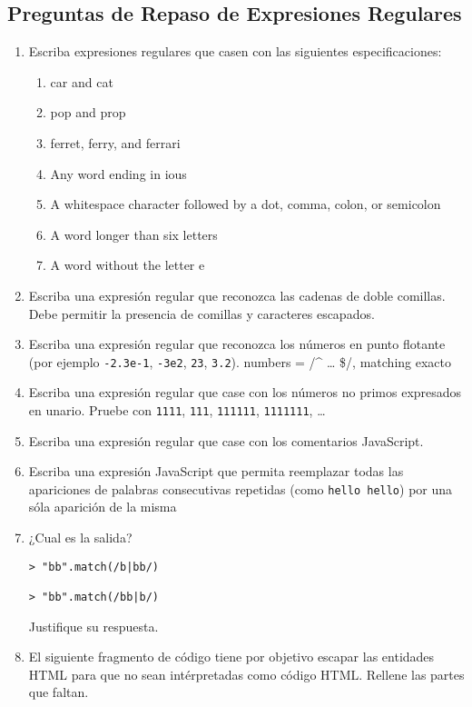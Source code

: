 \subsection{Preguntas de Repaso de Expresiones
Regulares}\label{preguntas-de-repaso-de-expresiones-regulares}

\begin{enumerate}
\def\labelenumi{\arabic{enumi}.}
\item
  Escriba expresiones regulares que casen con las siguientes
  especificaciones:

  \begin{enumerate}
  \def\labelenumii{\arabic{enumii}.}
  \itemsep1pt\parskip0pt
  \item
    car and cat
  \item
    pop and prop
  \item
    ferret, ferry, and ferrari
  \item
    Any word ending in ious
  \item
    A whitespace character followed by a dot, comma, colon, or semicolon
  \item
    A word longer than six letters
  \item
    A word without the letter e
  \end{enumerate}
\item
  Escriba una expresión regular que reconozca las cadenas de doble
  comillas. Debe permitir la presencia de comillas y caracteres
  escapados.
\item
  Escriba una expresión regular que reconozca los números en punto
  flotante (por ejemplo \texttt{-2.3e-1}, \texttt{-3e2}, \texttt{23},
  \texttt{3.2}). numbers = /\^{} \ldots{} \$/, matching exacto
\item
  Escriba una expresión regular que case con los números no primos
  expresados en unario. Pruebe con \texttt{1111}, \texttt{111},
  \texttt{111111}, \texttt{1111111}, \ldots{}
\item
  Escriba una expresión regular que case con los comentarios JavaScript.
\item
  Escriba una expresión JavaScript que permita reemplazar todas las
  apariciones de palabras consecutivas repetidas (como
  \texttt{hello hello}) por una sóla aparición de la misma
\item
  ¿Cual es la salida?

\begin{verbatim}
> "bb".match(/b|bb/)

> "bb".match(/bb|b/)
\end{verbatim}

  Justifique su respuesta.
\item
  El siguiente fragmento de código tiene por objetivo escapar las
  entidades HTML para que no sean intérpretadas como código HTML.
  Rellene las partes que faltan.
\end{enumerate}

